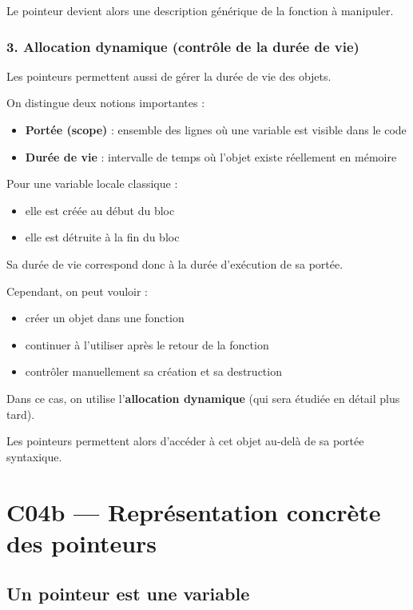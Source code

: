 Le pointeur devient alors une description générique
de la fonction à manipuler.

\subsubsection{3. Allocation dynamique (contrôle de la durée de vie)}

Les pointeurs permettent aussi de gérer la durée de vie des objets.

On distingue deux notions importantes :

\begin{itemize}
    \item \textbf{Portée (scope)} :
    ensemble des lignes où une variable est visible dans le code
    \item \textbf{Durée de vie} :
    intervalle de temps où l’objet existe réellement en mémoire
\end{itemize}

Pour une variable locale classique :

\begin{itemize}
    \item elle est créée au début du bloc
    \item elle est détruite à la fin du bloc
\end{itemize}

Sa durée de vie correspond donc à la durée d’exécution de sa portée.

Cependant, on peut vouloir :

\begin{itemize}
    \item créer un objet dans une fonction
    \item continuer à l’utiliser après le retour de la fonction
    \item contrôler manuellement sa création et sa destruction
\end{itemize}

Dans ce cas, on utilise l’\textbf{allocation dynamique}
(qui sera étudiée en détail plus tard).

Les pointeurs permettent alors d’accéder à cet objet
au-delà de sa portée syntaxique.

\section{C04b — Représentation concrète des pointeurs}

\subsection{Un pointeur est une variable}

